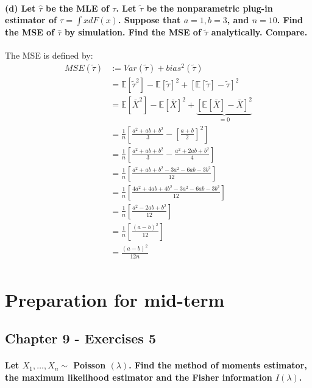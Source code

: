 \documentclass{article}
\newcommand{\E}{\mathbb{E}}
\begin{document}
\paragraph{(d) Let $\hat{\tau}$ be the MLE of $\tau$. Let $\widetilde{\tau}$ be the nonparametric plug-in estimator of $\tau=\int x d F(x)$. Suppose that $a=1, b=3$, and $n=10$. Find the MSE of $\hat{\tau}$ by simulation. Find the MSE of $\widetilde{\tau}$ analytically. Compare.\\}
The MSE is defined by:
\begin{align*}
    MSE (\tilde \tau)
     & := Var(\tilde\tau)   + bias^2 (\tilde \tau)                                          \\
     & = \E[\tilde\tau^2] - \E[\tilde\tau]^2 + \left[\E[\tilde\tau] - \tilde\tau\right]^2   \\
     & = \E[\bar X^2] - \E[\bar X]^2 + \underbrace{\left[\E[\bar X] - \bar X\right]^2}_{=0} \\
     & = \frac{1}{n}\left[\frac{a^2 + ab + b^2}{3} - \left[\frac{a+b}{2}\right]^2\right]    \\
     & = \frac{1}{n}\left[\frac{a^2 + ab + b^2}{3} - \frac{a^2 + 2ab + b^2}{4}\right]       \\
     & = \frac{1}{n}\left[\frac{a^2 + ab + b^2 - 3a^2 - 6ab - 3b^2}{12}\right]              \\
     & = \frac{1}{n}\left[\frac{4a^2 + 4ab + 4b^2 - 3a^2 - 6ab - 3b^2}{12}\right]           \\
     & = \frac{1}{n}\left[\frac{a^2 -2ab + b^2}{12}\right]                                  \\
     & = \frac{1}{n}\left[\frac{(a-b)^2}{12}\right]                                         \\
     & = \frac{(a-b)^2}{12n}                                                                \\
\end{align*}

\section{Preparation for mid-term}
\subsection{Chapter 9 - Exercises 5}

\paragraph{Let $X_{1}, \ldots, X_{n} \sim$ Poisson $(\lambda)$. Find the method of moments estimator, the maximum likelihood estimator and the Fisher information $I(\lambda)$.\\}
\end{document}
